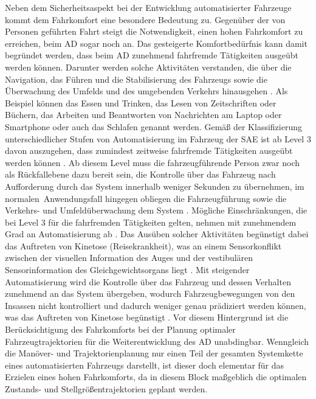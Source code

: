 Neben dem Sicherheitsaspekt bei der Entwicklung automatisierter Fahrzeuge kommt dem Fahrkomfort eine besondere Bedeutung zu. Gegenüber der von Personen geführten Fahrt steigt die Notwendigkeit, einen hohen Fahrkomfort zu erreichen, beim \gls{AD} sogar noch an. Das gesteigerte Komfortbedürfnis kann damit begründet werden, dass beim \gls{AD} zunehmend fahrfremde Tätigkeiten ausgeübt werden können. Darunter werden solche Aktivitäten verstanden, die über die Navigation, das Führen und die Stabilisierung des Fahrzeugs sowie die Überwachung des Umfelds und des umgebenden Verkehrs hinausgehen \cite{Festner.2019}. Als Beispiel können das Essen und Trinken, das Lesen von Zeitschriften oder Büchern, das Arbeiten und Beantworten von Nachrichten am Laptop oder Smartphone oder auch das Schlafen genannt werden. Gemäß der Klassifizierung unterschiedlicher Stufen von Automatisierung im Fahrzeug der \gls{SAE} \cite{SAETaxonomy.2018} ist ab Level 3 davon auszugehen, dass zumindest zeitweise fahrfremde Tätigkeiten ausgeübt werden können \cite{Festner.2019}. Ab diesem Level muss die fahrzeugführende Person zwar noch als Rückfallebene dazu bereit sein, die Kontrolle über das Fahrzeug nach Aufforderung durch das System innerhalb weniger Sekunden zu übernehmen, im \glqq normalen\grqq~Anwendungsfall hingegen obliegen die Fahrzeugführung sowie die Verkehrs- und Umfeldüberwachung dem System \cite{SAETaxonomy.2018}. Mögliche Einschränkungen, die bei Level 3 für die fahrfremden Tätigkeiten gelten, nehmen mit zunehmendem Grad an Automatisierung ab \cite{Festner.2019}. Das Ausüben solcher Aktivitäten begünstigt dabei das Auftreten von Kinetose (\glqq Reisekrankheit\grqq), was an einem Sensorkonflikt zwischen der visuellen Information des Auges und der vestibulären Sensorinformation des Gleichgewichtsorgans liegt \cite{Reason.1975,Golding.2006,Benson.2002}. Mit steigender Automatisierung wird die Kontrolle über das Fahrzeug und dessen Verhalten zunehmend an das System übergeben, wodurch Fahrzeugbewegungen von den Insassen nicht kontrolliert und dadurch weniger genau prädiziert werden können, was das Auftreten von Kinetose begünstigt \cite{Rolnick.1991}. Vor diesem Hintergrund ist die Berücksichtigung des Fahrkomforts bei der Planung optimaler Fahrzeugtrajektorien für die Weiterentwicklung des \gls{AD} unabdingbar. Wenngleich die Manöver- und Trajektorienplanung nur einen Teil der gesamten Systemkette eines automatisierten Fahrzeugs darstellt, ist dieser doch elementar für das Erzielen eines hohen Fahrkomforts, da in diesem Block maßgeblich die optimalen Zustands- und Stellgrößentrajektorien geplant werden. 

